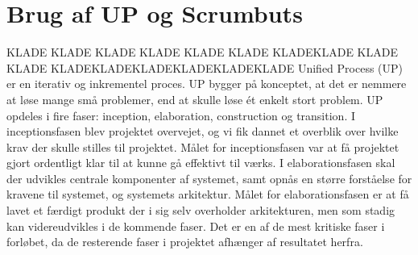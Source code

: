 

\section{Brug af UP og Scrumbuts}


KLADE KLADE KLADE KLADE KLADE KLADE KLADEKLADE KLADE KLADE KLADEKLADEKLADEKLADEKLADEKLADE
Unified Process (UP) er en iterativ og inkrementel proces. UP bygger på konceptet, at det er nemmere at løse mange små problemer, end at skulle løse ét enkelt stort problem. UP opdeles i fire faser: inception, elaboration, construction og transition.
I inceptionsfasen blev projektet overvejet, og vi fik dannet et overblik over hvilke krav der skulle stilles til projektet. Målet for inceptionsfasen var at få projektet gjort ordentligt klar til at kunne gå effektivt til værks.
I elaborationsfasen skal der udvikles centrale komponenter af systemet, samt opnås en større forståelse for kravene til systemet, og systemets arkitektur. Målet for elaborationsfasen er at få lavet et færdigt produkt der i sig selv overholder arkitekturen, men som stadig kan videreudvikles i de kommende faser. Det er en af de mest kritiske faser i forløbet, da de resterende faser i projektet afhænger af resultatet herfra.


